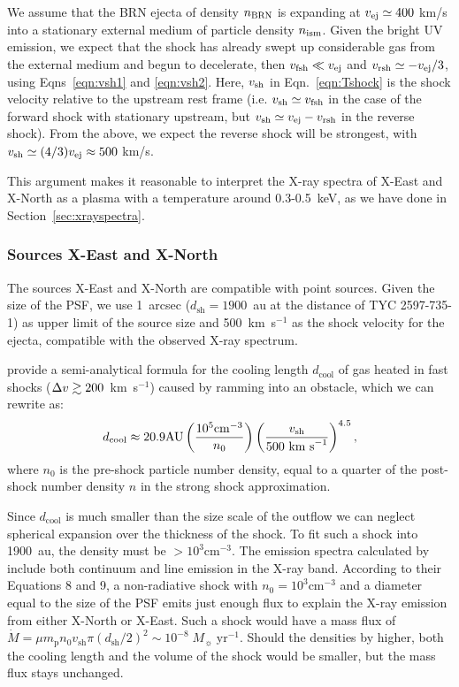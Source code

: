 \documentclass[linenumbers]{aastex631}
\begin{document}
We assume that the BRN ejecta of density $n_{\rm BRN}$ is expanding at $v_{\rm ej} \simeq 400$ km/s into a stationary external medium of particle density $n_{\rm ism}$. Given the bright UV emission, we expect that the shock has already swept up considerable gas from the external medium and begun to decelerate, then $v_{\rm fsh} \ll v_{\rm ej}$ and $v_{\rm rsh} \simeq -v_{\rm ej}/3$, using Eqns~\ref{eqn:vsh1} and \ref{eqn:vsh2}.  Here, $v_{\rm sh}$ in Eqn.~\ref{eqn:Tshock} is the shock velocity relative to the upstream rest frame (i.e. $v_{\rm sh} \simeq v_{\rm fsh}$ in the case of the forward shock with stationary upstream, but $v_{\rm sh} \simeq v_{\rm ej}-v_{\rm rsh}$ in the reverse shock).  From the above, we expect the reverse shock will be strongest, with $v_{\rm sh} \simeq (4/3)v_{\rm ej} \approx 500$ km/s.

This argument makes it reasonable to interpret the X-ray spectra of X-East and X-North as a plasma with a temperature around 0.3-0.5~keV, as we have done in Section~\ref{sec:xrayspectra}.

\subsubsection{Sources X-East and X-North}
\label{sec:xEN}
The sources X-East and X-North are compatible with point sources. Given the size of the PSF, we use 1~arcsec ($d_\mathrm{sh}=1900$~au at the distance of TYC 2597-735-1) as upper limit of the source size and 500~km~s$^{-1}$ as the shock velocity for the ejecta, compatible with the observed X-ray spectrum.

\citet{2002ApJ...576L.149R} provide a
semi-analytical formula for the cooling length
$d_{\mathrm{cool}}$ of gas
heated in fast shocks ($\Delta v \gtrsim 200$~km~s$^{-1}$) caused by ramming into an obstacle,
which we can rewrite as:
\begin{equation}
d_{\mathrm{cool}} \approx 20.9 \mathrm{ AU}
    \left(\frac{10^5\mathrm{ cm}^{-3}}{n_0}\right)
    \left(\frac{v_{\mathrm{sh}}}{500\textnormal{ km s}^{-1}}\right)^{4.5},
\label{raga}
\end{equation}
where $n_0$ is the pre-shock particle number density, equal to a
quarter of the post-shock number density $n$ in the strong shock
approximation.

Since $d_{\mathrm{cool}}$ is much smaller than the size scale of the outflow we can neglect spherical expansion over the thickness of the shock.
To fit such a shock into 1900~au, the density must be $>10^3\mathrm{ cm}^{-3}$. The emission spectra calculated by \citet{2002ApJ...576L.149R} include both continuum and line emission in the X-ray band. According to their Equations 8 and 9, a non-radiative shock with $n_0=10^3\mathrm{ cm}^{-3}$ and a diameter equal to the size of the PSF emits just enough flux to explain the X-ray emission from either X-North or X-East. Such a shock would have a mass flux of $\dot M = \mu m_\mathrm{p} n_0 v_\mathrm{sh} \pi (d_\mathrm{sh}/2)^2 \sim 10^{-8}\;M_\sun\;\mathrm{yr}^{-1}$.
Should the densities by higher, both the cooling length and the volume of the shock would be smaller, but the mass flux stays unchanged.
\end{document}
